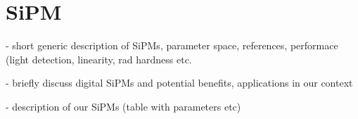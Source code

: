 \section{SiPM}
\label{sec:sipm}

- short generic description of SiPMs, parameter space, references, performace (light detection, linearity, rad hardness etc.

- briefly discuss digital SiPMs and potential benefits, applications in our context

- description of our SiPMs (table with parameters etc)
